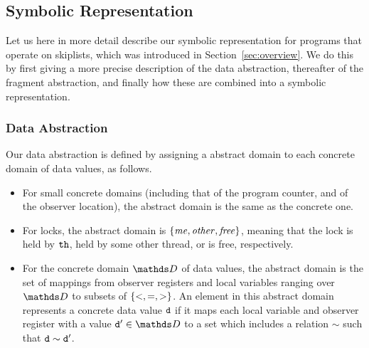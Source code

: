 
\subsection{Symbolic Representation}
\label{subsect:symbrep}
Let us here in more detail describe our symbolic representation for programs that
operate on skiplists, which was introduced in Section~\ref{sec:overview}.
We do this by first giving a more precise description of the data abstraction,
thereafter of the fragment abstraction, and finally how these are combined
into a symbolic representation.

\subsubsection{Data Abstraction}
Our data abstraction is defined by assigning a
abstract domain to each concrete domain of data values, as follows.
\begin{itemize}
\item For small concrete domains (including that of the program counter, and
  of the observer location),
  the abstract domain is the same as the concrete one.
\item
  For locks, the abstract domain is $\left\{\mathit{me},\mathit{other},\mathit{free}\right\}$,
  meaning that the lock is held by ${\tt th}$,  held by some other thread, or is
  free, respectively.
\item For the concrete domain $\ddomain$ of data values, the abstract domain
  is the set of mappings from observer registers and local variables
  ranging over $\ddomain$ to subsets of $\left\{<,=,>\right\}$.
  An element in this abstract domain represents a concrete data value $\tt d$
  if it maps each local variable and observer register with a value ${\tt d'} \in \ddomain$
  to a set which includes a relation $\sim$ such that $\tt d \sim \tt d'$.
\end{itemize}


